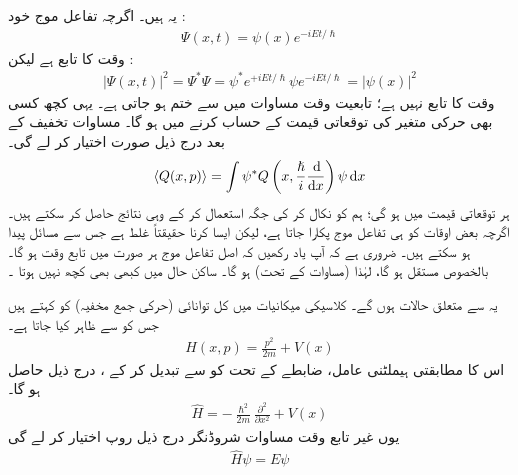 \quad 
یہ   ہیں۔ اگرچہ تفاعل موج خود :
\begin{align}\label{مساوات_شروڈنگر_غیر_تابع_اور_تابع}
\Psi (x,t) = \psi (x) e^{-iEt/\hslash}
\end{align}
وقت  کا تابع ہے لیکن  :
\begin{align}
\left| \Psi (x,t) \right|^{2} = \Psi^{*}\Psi = \psi^{*}e^{+iEt/\hslash} \psi e^{-iEt/\hslash} = \left| \psi (x) \right|^{2}
\end{align}
وقت کا تابع نہیں ہے؛ تابعیت وقت   مساوات میں سے ختم  ہو  جاتی ہے۔ یہی کچھ کسی بھی حرکی متغیر کی توقعاتی  قیمت  کے حساب  کرنے میں ہو گا۔ مساوات  تخفیف کے بعد درج ذیل صورت اختیار کر لے گی۔ 
\begin{align}\label{مساوات_غیر_تابع_وقت_توقعاتی_قیمت}
\langle Q(x,p) \rangle = \int \psi^{*} Q \left( x, \frac{\hslash}{i} \frac{\dif}{\dif x} \right) \psi \dif x
\end{align}
ہر توقعاتی قیمت  میں  ہو گی؛ ہم  کو نکال  کر    کی  جگہ  استعمال کر کے وہی نتائج حاصل کر سکتے ہیں۔ اگرچہ بعض اوقات  کو ہی تفاعل موج پکارا جاتا ہے، لیکن ایسا کرنا حقیقتاً غلط ہے جس سے مسائل پیدا  ہو سکتے ہیں۔ ضروری ہے کہ آپ یاد رکھیں کہ اصل تفاعل موج ہر صورت میں  تابع وقت ہو گا۔ بالخصوص  مستقل ہو گا،  لہٰذا (مساوات  کے تحت)  ہو گا۔ ساکن حال میں کبھی بھی کچھ نہیں ہوتا ۔ 

 \quad
یہ   سے متعلق حالات ہوں گے۔ کلاسیکی میکانیات میں کل توانائی (حرکی جمع مخفیہ) کو  کہتے ہیں جس کو  سے ظاہر کیا جاتا ہے۔ 
\begin{align}
H(x,p) = \frac{p^{2}}{2m} + V(x)
\end{align}
اس کا مطابقتی ہیملٹنی عامل، ضابطے  کے تحت   کو     سے تبدیل 
کر  کے  ،   درج ذیل حاصل ہو گا۔ 
\begin{align}
\hat{H} = - \frac{\hslash^{2}}{2m} \frac{\partial^{2}}{\partial x^{2}} + V(x) 
\end{align}
یوں غیر تابع وقت مساوات شروڈنگر  درج ذیل روپ اختیار کر لے گی 
\begin{align}\label{مساوات_غیر_تابع_شروڈنگر_توانائی_مساوات}
\hat{H} \psi = E\psi
\end{align}

